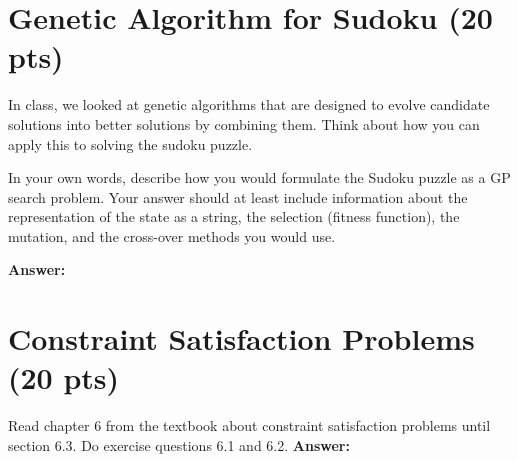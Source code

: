 \documentclass{article}
\begin{document}
\section{Genetic Algorithm for Sudoku (20 pts)}
In class, we looked at genetic algorithms that are designed to evolve candidate solutions into better solutions by combining them. Think about how you can apply this to solving the sudoku puzzle.

In your own words, describe how you would formulate the Sudoku puzzle as a GP search problem. Your answer should at least include information about the representation of the state as a string, the selection (fitness function), the mutation, and the cross-over methods you would use. 

\noindent \textbf{Answer:}

\section{Constraint Satisfaction Problems (20 pts)}
Read chapter 6 from the textbook about constraint satisfaction problems until section 6.3. Do exercise questions 6.1 and 6.2.
\noindent \textbf{Answer:}
\end{document}
